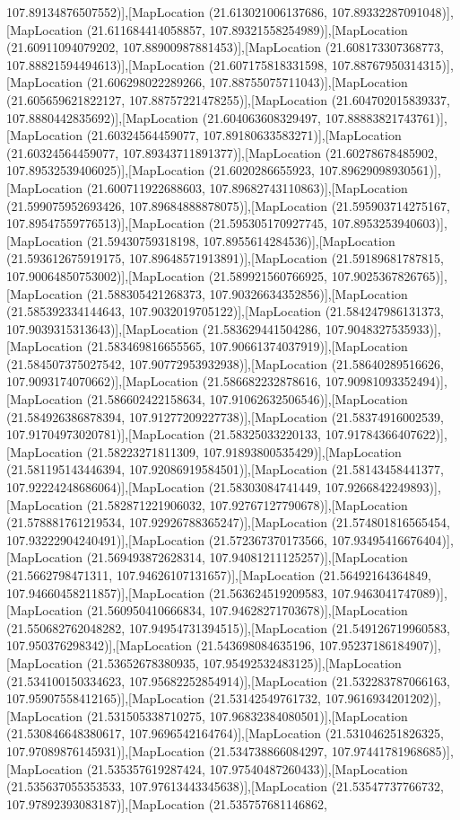 107.89134876507552)],[MapLocation (21.613021006137686, 107.89332287091048)],[MapLocation (21.611684414058857, 107.89321558254989)],[MapLocation (21.60911094079202, 107.88900987881453)],[MapLocation (21.608173307368773, 107.88821594494613)],[MapLocation (21.607175818331598, 107.88767950314315)],[MapLocation (21.606298022289266, 107.88755075711043)],[MapLocation (21.605659621822127, 107.88757221478255)],[MapLocation (21.604702015839337, 107.8880442835692)],[MapLocation (21.604063608329497, 107.88883821743761)],[MapLocation (21.60324564459077, 107.89180633583271)],[MapLocation (21.60324564459077, 107.89343711891377)],[MapLocation (21.60278678485902, 107.89532539406025)],[MapLocation (21.6020286655923, 107.89629098930561)],[MapLocation (21.600711922688603, 107.89682743110863)],[MapLocation (21.599075952693426, 107.89684888878075)],[MapLocation (21.595903714275167, 107.89547559776513)],[MapLocation (21.595305170927745, 107.8953253940603)],[MapLocation (21.59430759318198, 107.8955614284536)],[MapLocation (21.593612675919175, 107.89648571913891)],[MapLocation (21.59189681787815, 107.90064850753002)],[MapLocation (21.589921560766925, 107.9025367826765)],[MapLocation (21.588305421268373, 107.90326634352856)],[MapLocation (21.585392334144643, 107.9032019705122)],[MapLocation (21.584247986131373, 107.9039315313643)],[MapLocation (21.583629441504286, 107.9048327535933)],[MapLocation (21.583469816655565, 107.90661374037919)],[MapLocation (21.584507375027542, 107.90772953932938)],[MapLocation (21.58640289516626, 107.9093174070662)],[MapLocation (21.586682232878616, 107.90981093352494)],[MapLocation (21.586602422158634, 107.91062632506546)],[MapLocation (21.584926386878394, 107.91277209227738)],[MapLocation (21.58374916002539, 107.91704973020781)],[MapLocation (21.58325033220133, 107.91784366407622)],[MapLocation (21.58223271811309, 107.91893800535429)],[MapLocation (21.581195143446394, 107.92086919584501)],[MapLocation (21.58143458441377, 107.92224248686064)],[MapLocation (21.58303084741449, 107.9266842249893)],[MapLocation (21.582871221906032, 107.92767127790678)],[MapLocation (21.578881761219534, 107.92926788365247)],[MapLocation (21.574801816565454, 107.93222904240491)],[MapLocation (21.572367370173566, 107.93495416676404)],[MapLocation (21.569493872628314, 107.94081211125257)],[MapLocation (21.5662798471311, 107.94626107131657)],[MapLocation (21.56492164364849, 107.94660458211857)],[MapLocation (21.563624519209583, 107.9463041747089)],[MapLocation (21.560950410666834, 107.94628271703678)],[MapLocation (21.550682762048282, 107.94954731394515)],[MapLocation (21.549126719960583, 107.950376298342)],[MapLocation (21.543698084635196, 107.95237186184907)],[MapLocation (21.53652678380935, 107.95492532483125)],[MapLocation (21.534100150334623, 107.95682252854914)],[MapLocation (21.532283787066163, 107.95907558412165)],[MapLocation (21.53142549761732, 107.9616934201202)],[MapLocation (21.531505338710275, 107.96832384080501)],[MapLocation (21.530846648380617, 107.9696542164764)],[MapLocation (21.531046251826325, 107.97089876145931)],[MapLocation (21.534738866084297, 107.97441781968685)],[MapLocation (21.535357619287424, 107.97540487260433)],[MapLocation (21.535637055353533, 107.97613443345638)],[MapLocation (21.53547737766732, 107.97892393083187)],[MapLocation (21.535757681146862, 